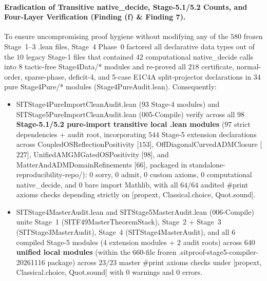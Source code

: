 \documentclass[american,11pt,letterpaper]{article}
\def\texttt#1{#1}%
\begin{document}
\paragraph{Eradication of Transitive \texttt{native\_decide}, Stage-5.1/5.2 Counts, and Four-Layer Verification (\texttt{Finding (f)} \& \texttt{Finding 7}).}
To ensure uncompromising proof hygiene without modifying any of the $580$ frozen Stage~1--3 \texttt{.lean} files, Stage~4 Phase~0 factored all declarative data types out of the $10$ legacy Stage-1 files that contained $42$ computational \texttt{native\_decide} calls into $8$ tactic-free \texttt{Stage4Data/*} modules and re-proved all $218$ certificate, normal-order, sparse-phase, deficit-4, and 5-case \texttt{E1C4A} split-projector declarations in $34$ pure \texttt{Stage4Pure/*} modules (\texttt{Stage4PureAudit.lean}). Consequently:
\begin{itemize}
  \item \texttt{SITStage4\allowbreak{}Pure\allowbreak{}Import\allowbreak{}Clean\allowbreak{}Audit.\allowbreak{}lean} ($93$ Stage-4 modules) and \texttt{SITStage5\allowbreak{}Pure\allowbreak{}Import\allowbreak{}Clean\allowbreak{}Audit.\allowbreak{}lean} (\texttt{005-Compile}) verify across all \textbf{$98$ Stage-5.1/5.2 pure-import transitive local \texttt{.lean} modules} ($97$ strict dependencies + audit root, incorporating $544$ Stage-5 extension declarations across \texttt{Coupled\allowbreak{}OSReflection\allowbreak{}Positivity} [$153$], \texttt{Off\allowbreak{}Diagonal\allowbreak{}Curved\allowbreak{}ADMClosure} [$227$], \texttt{Unified\allowbreak{}AMGMGated\allowbreak{}OSPositivity} [$98$], and \texttt{Matter\allowbreak{}And\allowbreak{}ADMDomain\allowbreak{}Refinements} [$66$], packaged in \texttt{standalone-reproducibility-repo/}): \texttt{0} \texttt{sorry}, \texttt{0} \texttt{admit}, \texttt{0} custom axioms, \texttt{0} computational \texttt{native\_decide}, and \texttt{0} bare \texttt{import Mathlib}, with all $64/64$ audited \texttt{\#print axioms} checks depending strictly on \texttt{[propext, Classical.\allowbreak{}choice, Quot.\allowbreak{}sound]}.
  \item \texttt{SITStage4\allowbreak{}Master\allowbreak{}Audit.\allowbreak{}lean} and \texttt{SITStage5\allowbreak{}Master\allowbreak{}Audit.\allowbreak{}lean} (\texttt{006-Compile}) unite Stage~1 (\texttt{SITF49\allowbreak{}Master\allowbreak{}Theorem\allowbreak{}Stack}), Stage~2 + Stage~3 (\texttt{SITStage3MasterAudit}), Stage~4 (\texttt{SITStage4MasterAudit}), and all $6$ compiled Stage-5 modules ($4$ extension modules + $2$ audit roots) across \textbf{$640$ unified local modules} (within the $660$-file frozen \texttt{.\allowbreak{}sitproof-stage5-compiler-20261116} package) across $23/23$ master \texttt{\#print axioms} checks under \texttt{[propext, Classical.\allowbreak{}choice, Quot.\allowbreak{}sound]} with \texttt{0} warnings and \texttt{0} errors.

\end{itemize}
\end{document}
